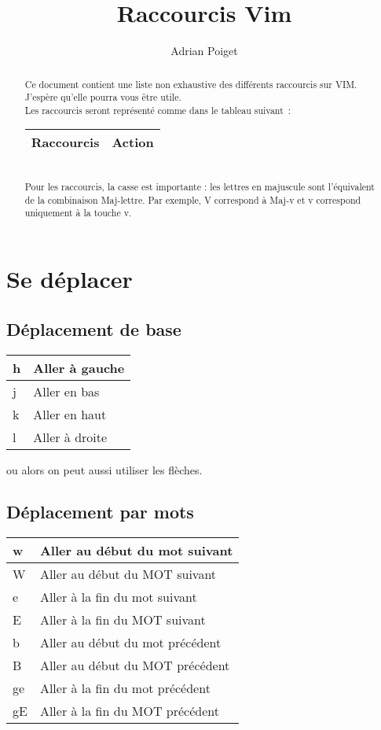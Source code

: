 \documentclass{article}
\title{Raccourcis Vim}
\author{Adrian Poiget}
\begin{document}
\maketitle
\begin{abstract}
Ce document contient une liste non exhaustive des différents raccourcis sur VIM.
J'espère qu'elle pourra vous être utile.\\
Les raccourcis seront représenté comme dans le tableau suivant~: 
\begin{tabular}{|p{3cm}| l|  }
\hline
Raccourcis & Action\\ \hline
\end{tabular}\\
Pour les raccourcis, la casse est importante : les lettres en majuscule sont l'équivalent de la combinaison Maj-lettre. Par exemple, V correspond à Maj-v et v correspond uniquement à la touche v.
\end{abstract}

\tableofcontents
\newpage

\section{Se déplacer}
\subsection{Déplacement de base}
\begin{tabular}{|p{3cm}| l|  }
	\hline
	h & Aller à gauche \\ \hline
	j & Aller en bas \\ \hline
	k & Aller en haut \\ \hline
	l & Aller à droite \\ \hline
\end{tabular}
ou alors on peut aussi utiliser les flèches.

\subsection{Déplacement par mots}
\begin{tabular}{|p{3cm}| l|  }
	\hline
	w & Aller au début du mot suivant\\ \hline
	W & Aller au début du MOT suivant\\ \hline
	e & Aller à la fin du mot suivant\\ \hline
	E & Aller à la fin du MOT suivant\\ \hline
	b & Aller au début du mot précédent\\ \hline
	B & Aller au début du MOT précédent\\ \hline
    ge & Aller à la fin du mot précédent\\ \hline
	gE & Aller à la fin du MOT précédent\\ \hline
\end{tabular}\\
\end{document}
